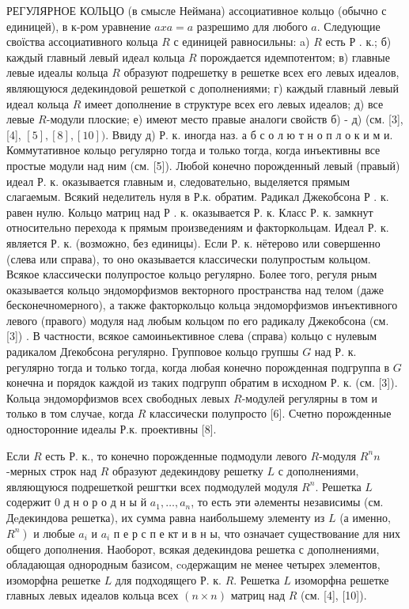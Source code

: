 \documentclass[10pt]{article}
\begin{document}
РЕГУЛЯРНОЕ КОЛЬЦО (в смысле Неймана) ассоциативное кольцо (обычно с единицей), в к-ром уравнение $a x a=a$ разрешимо для любого $a$. Следующие своїства ассоциативного кольца $R$ с единицей равносильны: a) $R$ есть Р . к.; б) каждый главный левый идеал кольца $R$ порождается идемпотентом; в) главные левые идеалы кольца $R$ образуют подрешетку в решетке всех его левых идеалов, являющуюся дедекиндовой решеткой с дополнениями; г) каждый главный левый идеал кольца $R$ имеет дополнение в структуре всех его левых идеалов; д) все левые $R$-модули плоские; е) имеют место правые аналоги свойств б) - д) (см. [3], [4], $[5],[8],[10])$. Ввиду д) Р. к. иногда наз. а б с о л ю т н о п л о к и м и. Коммутативное кольцо регулярно тогда и только тогда, когда инъективны все простые модули над ним (см. [5]). Любой конечно порожденный левый (правый) идеал Р. к. оказывается главным и, следовательно, выделяется прямым слагаемым. Всякий неделитель нуля в Р.к. обратим. Радикал Джекобсона Р . к. равен нулю. Кольцо матриц над Р . к. оказывается Р. к. Класс Р. к. замкнут относительно перехода к прямым произведениям и факторкольцам. Идеал Р. к. является Р. к. (возможно, без единицы). Если Р. к. нётерово или совершенно (слева или справа), то оно оказывается классически полупростым кольцом. Всякое классически полупростое кольцо регулярно. Более того, регуля рным оказывается кольцо эндоморфизмов векторного пространства над телом (даже бесконечномерного), а также факторкольцо кольца эндоморфизмов инъективного левого (правого) модуля над любым кольцом по его радикалу Джекобсона (см. [3]) . В частности, всякое самоиньективное слева (справа) кольцо с нулевым радикалом Дґекобсона регулярно. Групповое кольцо групшы $G$ над Р. к. регулярно тогда и только тогда, когда любая конечно порожденная подгруппа в $G$ конечна и порядок каждой из таких подгрупп обратим в исходном Р. к. (см. [3]). Кольца эндоморфизмов всех свободных левых $R$-модулей регулярны в том и только в том случае, когда $R$ классически полупросто [6]. Счетно порожденные односторонние идеалы Р.к. проективны [8].



Если $R$ есть Р. к., то конечно порожденные подмодули левого $R$-модуля $R^{n} n$-мерных строк над $R$ образуют дедекиндову решетку $L$ с дополнениями, являющуюся подрешеткой решгтки всех подмодулей модуля $R^{n}$. Решетка $L$ содержит 0 д н о р о д н ы й $a_{1}, \ldots, a_{n}$, то есть эти әлементы независимы (см. Дeдекиндова решетка), их сумма равна наибольшему элементу из $L$ (а именно, $\left.R^{n}\right)$ и любые $a_{i}$ и $a_{i}$ п е р с п е кт и в н ы, что означает существование для них общего дополнения. Наоборот, всякая дедекиндова решетка с дополнениями, обладающая однородным базисом, coдержащим не менее четырех элементов, изоморфна решетке $L$ для подходящего Р. к. $R$. Решетка $L$ изоморфна решетке главных левых идеалов кольца всех $(n \times n)$ матриц над $R$ (см. [4], [10]).
\end{document}
